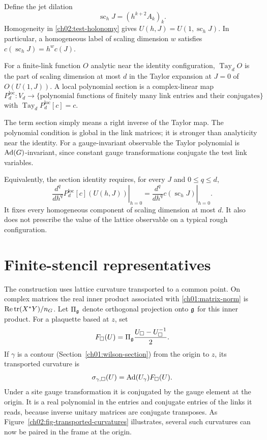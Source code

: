 Define the jet dilation
\begin{equation}
 \operatorname{sc}_hJ=(h^{k+2}A_k)_k.
 \label{ch02:jet-dilation}
\end{equation}
Homogeneity in \eqref{ch02:test-holonomy} gives
$U(h,J)=U(1,\operatorname{sc}_hJ)$. In particular, a homogeneous label of
scaling dimension $w$ satisfies $c(\operatorname{sc}_hJ)=h^wc(J)$.

\begin{definition}
\label{ch02:taylor-map}
For a finite-link function $O$ analytic near the identity configuration,
$\operatorname{Tay}_d O$ is the part of scaling dimension at most $d$ in
the Taylor expansion at $J=0$ of $O(U(1,J))$.
A local polynomial section is a complex-linear map
\[
 P_d^{\mathrm{loc}}:V_d\longrightarrow
       \{\text{polynomial functions of finitely many link entries and their
       conjugates}\}
\]
with $\operatorname{Tay}_dP_d^{\mathrm{loc}}[c]=c$.
\end{definition}
The term section simply means a right inverse of the Taylor map. The
polynomial condition is global in the link matrices; it is stronger than
analyticity near the identity. For a gauge-invariant observable the Taylor
polynomial is $\operatorname{Ad}(G)$-invariant, since constant gauge transformations
conjugate the test link variables.

Equivalently, the section identity requires, for every $J$ and $0\le q\le d$,
\begin{equation}
 \left.\frac{d^q}{dh^q}P_d^{\mathrm{loc}}[c](U(h,J))\right|_{h=0}
 =\left.\frac{d^q}{dh^q}c(\operatorname{sc}_hJ)\right|_{h=0}.
 \label{ch02:taylor-identity}
\end{equation}
It fixes every homogeneous component of scaling dimension at most $d$. It also does not prescribe the value of the lattice observable
on a typical rough configuration.

\section{Finite-stencil representatives}
\label{ch02:sections}

The construction uses lattice curvature transported to a common point.
On complex matrices the real inner product associated with
\eqref{ch01:matrix-norm} is $\operatorname{Re}\operatorname{tr}(X^*Y)/n_G$.
Let $\Pi_{\mathfrak g}$ denote orthogonal projection onto $\mathfrak g$ for this
inner product. For a plaquette based at $z$, set
\[
 F_\square(U)=\Pi_{\mathfrak g}\frac{U_\square-U_\square^{-1}}2.
\]
If $\gamma$ is a contour (Section~\ref{ch01:wilson-section}) from the origin to $z$, its transported
curvature is
\begin{equation}
 \sigma_{\gamma,\square}(U)=\operatorname{Ad}(U_\gamma)F_\square(U).
 \label{ch02:transported-curvature}
\end{equation}
Under a site gauge transformation it is conjugated by the gauge element
at the origin. It is a real polynomial in the entries and conjugate
entries of the links it reads, because inverse unitary matrices are
conjugate transposes. As Figure~\ref{ch02:fig-transported-curvatures}
illustrates, several such curvatures can now be paired in the frame at
the origin.

